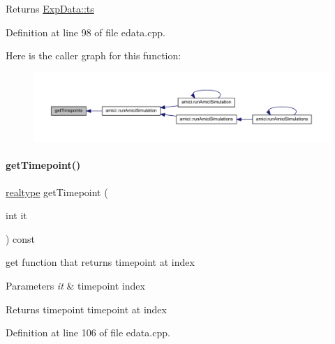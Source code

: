 \begin{DoxyReturn}{Returns}
\mbox{\hyperlink{classamici_1_1_exp_data_aa7014a80e7b102f85a10e3b9a480e8e5}{Exp\+Data\+::ts}} 
\end{DoxyReturn}


Definition at line 98 of file edata.\+cpp.

Here is the caller graph for this function\+:
\nopagebreak
\begin{figure}[H]
\begin{center}
\leavevmode
\includegraphics[width=350pt]{classamici_1_1_exp_data_a50ea5198d117f8f4ad1e34bb279975c8_icgraph}
\end{center}
\end{figure}
\mbox{\label{classamici_1_1_exp_data_abee92d90cb7fe75fa39fb98c2ab0fd0a}} 
\paragraph{\texorpdfstring{get\+Timepoint()}{getTimepoint()}}
{\footnotesize\ttfamily \mbox{\hyperlink{namespaceamici_a1bdce28051d6a53868f7ccbf5f2c14a3}{realtype}} get\+Timepoint (\begin{DoxyParamCaption}\item[{int}]{it }\end{DoxyParamCaption}) const}

get function that returns timepoint at index


\begin{DoxyParams}{Parameters}
{\em it} & timepoint index \\
\hline
\end{DoxyParams}
\begin{DoxyReturn}{Returns}
timepoint timepoint at index 
\end{DoxyReturn}


Definition at line 106 of file edata.\+cpp.

\mbox{\label{classamici_1_1_exp_data_a85ca23791c279fe94e5d9f8e528ca63e}} 
